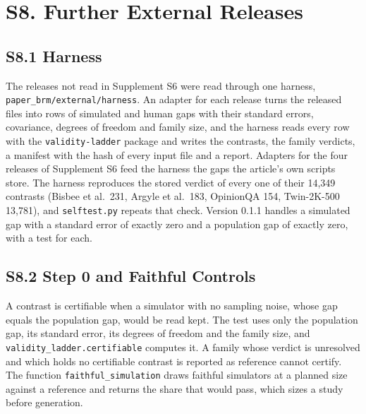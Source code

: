 
\section{S8. Further External Releases}
\label{sec:s8}

\subsection*{S8.1 Harness}

The releases not read in Supplement S6 were read through one harness, \texttt{paper\_brm/external/harness}.
An adapter for each release turns the released files into rows of simulated and human gaps with their standard errors, covariance, degrees of freedom and family size, and the harness reads every row with the \texttt{validity-ladder} package and writes the contrasts, the family verdicts, a manifest with the hash of every input file and a report.
Adapters for the four releases of Supplement S6 feed the harness the gaps the article's own scripts store.
The harness reproduces the stored verdict of every one of their 14,349 contrasts (Bisbee et al.\ 231, Argyle et al.\ 183, OpinionQA 154, Twin-2K-500 13,781), and \texttt{selftest.py} repeats that check.
Version 0.1.1 handles a simulated gap with a standard error of exactly zero and a population gap of exactly zero, with a test for each.

\subsection*{S8.2 Step 0 and Faithful Controls}

A contrast is certifiable when a simulator with no sampling noise, whose gap equals the population gap, would be read kept.
The test uses only the population gap, its standard error, its degrees of freedom and the family size, and \texttt{validity\_ladder.certifiable} computes it.
A family whose verdict is unresolved and which holds no certifiable contrast is reported as reference cannot certify.
The function \texttt{faithful\_simulation} draws faithful simulators at a planned size against a reference and returns the share that would pass, which sizes a study before generation.

